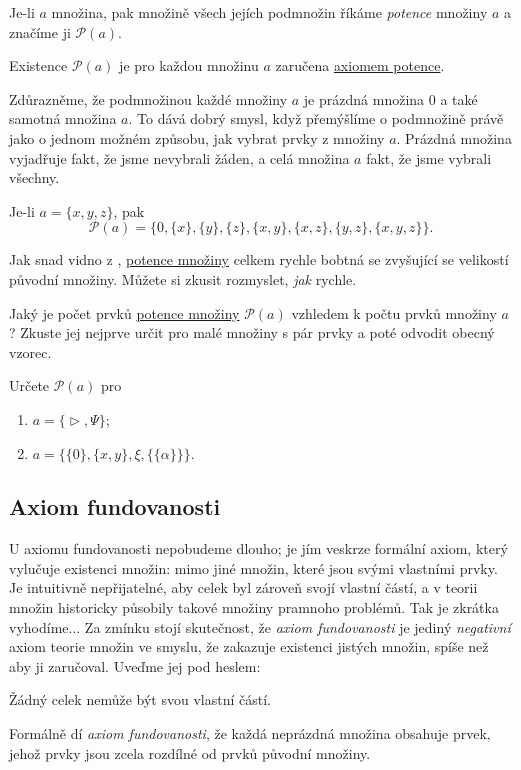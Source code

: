 \begin{definition}
  \label{def:potence-mnoziny}
  Je-li $a$ množina, pak množině všech jejích podmnožin říkáme \emph{potence}
  množiny $a$ a značíme ji $\mathcal{P}(a)$.

  Existence $\mathcal{P}(a)$ je pro každou množinu $a$ zaručena
  \hyperref[eq:axiom-potence]{axiomem potence}.
\end{definition}
\lessboxspace
\begin{remark}
  Zdůrazněme, že podmnožinou každé množiny $a$ je prázdná množina $0$ a také
  samotná množina $a$. To dává dobrý smysl, když přemýšlíme o podmnožině právě
  jako o jednom možném způsobu, jak vybrat prvky z množiny $a$. Prázdná množina
  vyjadřuje fakt, že jsme nevybrali žáden, a celá množina $a$ fakt, že jsme
  vybrali všechny.
\end{remark}
\begin{example}
  \label{exam:axiom-potence}
  Je-li $a = \{x, y, z\}$, pak
  \[
    \mathcal{P}(a) = \{0, \{x\}, \{y\}, \{z\}, \{x, y\}, \{x, z\}, \{y, z\},
    \{x, y, z\}\}.
  \]
\end{example}
Jak snad vidno z ,
\hyperref[def:potence-mnoziny]{potence množiny} celkem rychle bobtná se
zvyšující se velikostí původní množiny. Můžete si zkusit rozmyslet, \emph{jak}
rychle.
\begin{hardExercise}
  Jaký je počet prvků \hyperref[def:potence-mnoziny]{potence množiny}
  $\mathcal{P}(a)$ vzhledem k počtu prvků množiny $a$? Zkuste jej nejprve určit
  pro malé množiny s pár prvky a poté odvodit obecný vzorec.
\end{hardExercise}
\lessboxspace
\begin{exercise}
  Určete $\mathcal{P}(a)$ pro
  \begin{enumerate}
    \item $a = \{\vartriangleright, \Psi\}$;
    \item $a = \{\{0\}, \{x, y\}, \xi, \{\{\alpha\}\}\}$.
  \end{enumerate}
\end{exercise}

\subsection{Axiom fundovanosti}
\label{ssec:axiom-fundovanosti}

U axiomu fundovanosti nepobudeme dlouho; je jím veskrze formální axiom, který
vylučuje existenci  množin: mimo jiné množin, které jsou svými
vlastními prvky. Je intuitivně nepřijatelné, aby celek byl zároveň svojí vlastní
částí, a v teorii množin historicky působily takové množiny pramnoho problémů.
Tak je zkrátka vyhodíme... Za zmínku stojí skutečnost, že \emph{axiom
fundovanosti} je jediný \emph{negativní} axiom teorie množin ve smyslu, že
zakazuje existenci jistých množin, spíše než aby ji zaručoval. Uveďme jej pod
heslem:
\begin{highlightBox}
  \alert{Žádný celek nemůže být svou vlastní částí.}
\end{highlightBox}
Formálně dí \emph{axiom fundovanosti}, že každá neprázdná množina obsahuje
prvek, jehož prvky jsou zcela rozdílné od prvků původní množiny.

